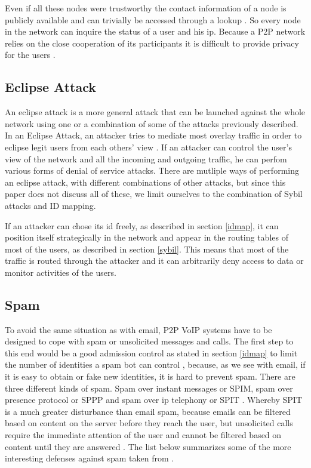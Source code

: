 \documentclass[a4paper,conference]{IEEEtran}
\begin{document}
Even if all these nodes were trustworthy the contact information of a node is
publicly available and can trivially be accessed through a lookup
\cite{koskelaold}.
So every node in the network can inquire the status of a user and his ip.
Because a P2P network relies on the close cooperation of its participants
it is difficult to provide privacy for the users \cite{koskelaold}.

\subsection{Eclipse Attack}
\label{eclipse}
An eclipse attack is a more general attack that can be launched against the whole network using one or a combination of some of the attacks previously described.
In an Eclipse Attack, an attacker tries to mediate most overlay traffic in order to eclipse legit users from each others’ view \cite{touceda}. If an attacker
can control the user's view of the network and all the incoming and outgoing traffic, he can perfom various forms of denial of service attacks. There are
mutliple ways of performing an eclipse attack, with different combinations of other attacks, but since this paper does not discuss all of these, we
limit ourselves to the combination of Sybil attacks and ID mapping.

If an attacker can chose its id freely, as described in section \ref{idmap}, it can position itself strategically in the network and appear in the routing
tables of most of the users, as described in section \ref{sybil}. This means that most of the traffic is routed through the attacker and it can arbitrarily deny
access to data or monitor activities of the users.

\subsection{Spam}
\label{spam}
To avoid the same situation as with email, P2P VoIP systems have to be designed
to cope with spam or unsolicited messages and calls. The first step to this end
would be a good admission control as stated in section \ref{idmap} to limit the
number of identities a spam bot can control \cite{touceda}, because, as we see
with email,
if it is easy to obtain or fake new identities, it is hard to prevent spam.
There are three different kinds of spam. Spam over instant messages or SPIM,
spam over
presence protocol or SPPP and spam over ip telephony or SPIT \cite{touceda}.
Whereby SPIT is a much greater disturbance than email spam, because emails can
be filtered based on content on the server before they reach the user, but
unsolicited calls require the immediate attention of the user and cannot be
filtered
based on content until they are answered \cite{heikkilae}. The list below
summarizes some of the more interesting defenses against spam taken from
\cite{touceda}.
\end{document}
